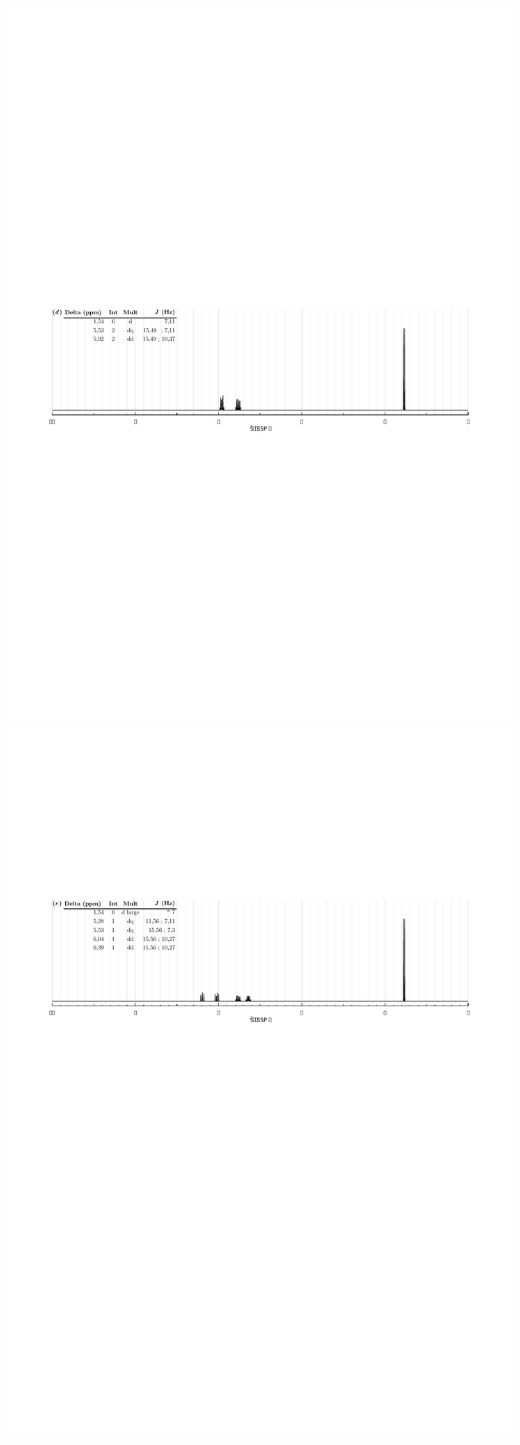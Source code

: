 \begin{center}
    \includegraphics[width=.95\linewidth]{chimiePC/orga/RMN_EE.pdf}
    \includegraphics[width=.95\linewidth]{chimiePC/orga/RMN_ZE.pdf}

\end{center}
